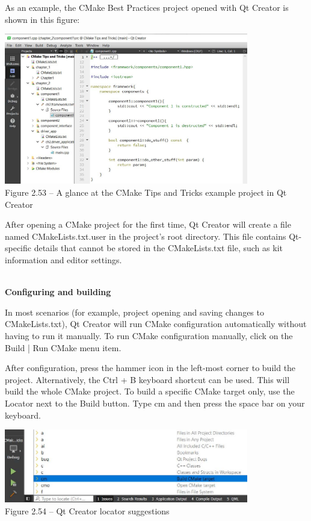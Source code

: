As an example, the CMake Best Practices project opened with Qt Creator is shown in this figure:

\begin{center}
\includegraphics[width=0.8\textwidth]{content/1/chapter2/images/53.jpg}\\
Figure 2.53 – A glance at the CMake Tips and Tricks example project in Qt Creator
\end{center}

After opening a CMake project for the first time, Qt Creator will create a file named CMakeLists.txt.user in the project's root directory. This file contains Qt-specific details that cannot be stored in the CMakeLists.txt file, such as kit information and editor settings.

\hspace*{\fill} \\ %
\noindent
\textbf{Configuring and building}

In most scenarios (for example, project opening and saving changes to CMakeLists.txt), Qt Creator will run CMake configuration automatically without having to run it manually. To run CMake configuration manually, click on the Build | Run CMake menu item.

After configuration, press the hammer icon in the left-most corner to build the project. Alternatively, the Ctrl + B keyboard shortcut can be used. This will build the whole CMake project. To build a specific CMake target only, use the Locator next to the Build button. Type cm and then press the space bar on your keyboard.

\begin{center}
\includegraphics[width=0.8\textwidth]{content/1/chapter2/images/54.jpg}\\
Figure 2.54 – Qt Creator locator suggestions
\end{center}

